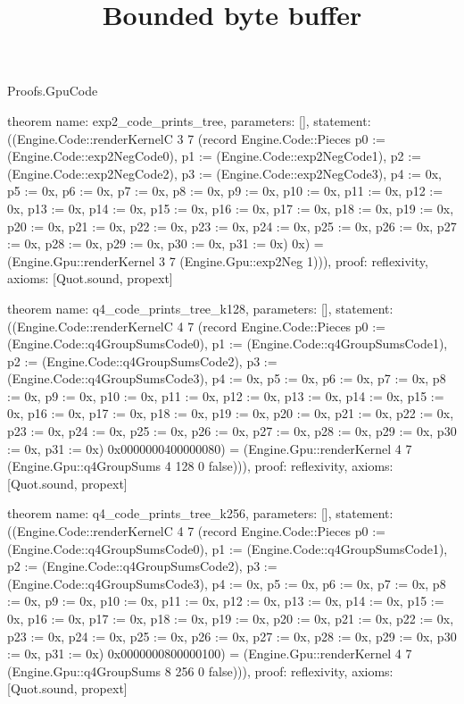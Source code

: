 \begin{lexlean}{Proofs.GpuCode}
\title{Bounded byte buffer}
\begin{semanticmodule}
theorem{
  name: exp2_code_prints_tree,
  parameters: [],
  statement: ((Engine.Code::renderKernelC 3 7 (record Engine.Code::Pieces {p0 := (Engine.Code::exp2NegCode0), p1 := (Engine.Code::exp2NegCode1), p2 := (Engine.Code::exp2NegCode2), p3 := (Engine.Code::exp2NegCode3), p4 := 0x, p5 := 0x, p6 := 0x, p7 := 0x, p8 := 0x, p9 := 0x, p10 := 0x, p11 := 0x, p12 := 0x, p13 := 0x, p14 := 0x, p15 := 0x, p16 := 0x, p17 := 0x, p18 := 0x, p19 := 0x, p20 := 0x, p21 := 0x, p22 := 0x, p23 := 0x, p24 := 0x, p25 := 0x, p26 := 0x, p27 := 0x, p28 := 0x, p29 := 0x, p30 := 0x, p31 := 0x}) 0x) = (Engine.Gpu::renderKernel 3 7 (Engine.Gpu::exp2Neg 1))),
  proof: reflexivity{},
  axioms: [Quot.sound, propext]
}

theorem{
  name: q4_code_prints_tree_k128,
  parameters: [],
  statement: ((Engine.Code::renderKernelC 4 7 (record Engine.Code::Pieces {p0 := (Engine.Code::q4GroupSumsCode0), p1 := (Engine.Code::q4GroupSumsCode1), p2 := (Engine.Code::q4GroupSumsCode2), p3 := (Engine.Code::q4GroupSumsCode3), p4 := 0x, p5 := 0x, p6 := 0x, p7 := 0x, p8 := 0x, p9 := 0x, p10 := 0x, p11 := 0x, p12 := 0x, p13 := 0x, p14 := 0x, p15 := 0x, p16 := 0x, p17 := 0x, p18 := 0x, p19 := 0x, p20 := 0x, p21 := 0x, p22 := 0x, p23 := 0x, p24 := 0x, p25 := 0x, p26 := 0x, p27 := 0x, p28 := 0x, p29 := 0x, p30 := 0x, p31 := 0x}) 0x0000000400000080) = (Engine.Gpu::renderKernel 4 7 (Engine.Gpu::q4GroupSums 4 128 0 false))),
  proof: reflexivity{},
  axioms: [Quot.sound, propext]
}

theorem{
  name: q4_code_prints_tree_k256,
  parameters: [],
  statement: ((Engine.Code::renderKernelC 4 7 (record Engine.Code::Pieces {p0 := (Engine.Code::q4GroupSumsCode0), p1 := (Engine.Code::q4GroupSumsCode1), p2 := (Engine.Code::q4GroupSumsCode2), p3 := (Engine.Code::q4GroupSumsCode3), p4 := 0x, p5 := 0x, p6 := 0x, p7 := 0x, p8 := 0x, p9 := 0x, p10 := 0x, p11 := 0x, p12 := 0x, p13 := 0x, p14 := 0x, p15 := 0x, p16 := 0x, p17 := 0x, p18 := 0x, p19 := 0x, p20 := 0x, p21 := 0x, p22 := 0x, p23 := 0x, p24 := 0x, p25 := 0x, p26 := 0x, p27 := 0x, p28 := 0x, p29 := 0x, p30 := 0x, p31 := 0x}) 0x0000000800000100) = (Engine.Gpu::renderKernel 4 7 (Engine.Gpu::q4GroupSums 8 256 0 false))),
  proof: reflexivity{},
  axioms: [Quot.sound, propext]
}


\end{semanticmodule}
\end{lexlean}
